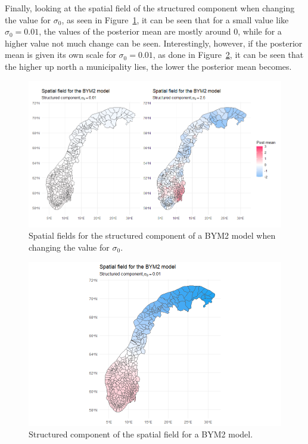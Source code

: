 Finally, looking at the spatial field of the structured component when changing the value for $\sigma_0$, as seen in Figure~\ref{comparison_norway_8}, it can be seen that for a small value like $\sigma_0 = 0.01$, the values of the posterior mean are mostly around 0, while for a higher value not much change can be seen. Interestingly, however, if the posterior mean is given its own scale for $\sigma_0 = 0.01$, as done in Figure~\ref{comparison_norway_9}, it can be seen that the higher up north a municipality lies, the lower the posterior mean becomes.
\begin{figure}[H]
    \centering
    \includegraphics[width = \textwidth]{spatial_field_norway_3.png}
    \caption{Spatial fields for the structured component of a BYM2 model when changing the value for $\sigma_0$.}
    \label{comparison_norway_8}
\end{figure}
%     
\begin{figure}[H]
    \centering
    \includegraphics[width = \textwidth]{spatial_field_norway_4.png}
    \caption{Structured component of the spatial field for a BYM2 model.}
    \label{comparison_norway_9}
\end{figure}

